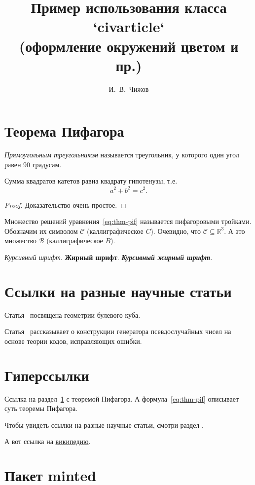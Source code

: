 \documentclass[12pt, minted]{civarticle}
\title{
    Пример использования класса `civarticle`\\
    \small{(оформление окружений цветом и пр.)}
}
\author{И.~В.~Чижов}
\begin{document}
    \section{Теорема Пифагора}
    \label{sec:thm-pif}
    \begin{definition}
        \label{def:triangle}
        \emph{Прямоугольным треугольником} называется треугольник, у которого один угол равен 90 градусам.
    \end{definition}
    \begin{theorem}
        Сумма квадратов катетов равна квадрату гипотенузы, т.е.
        \begin{equation}
            \label{eq:thm-pif}
            a^2+b^2=c^2.
        \end{equation}
    \end{theorem}
    \begin{proof}
        Доказательство очень простое.
    \end{proof}
    Множество решений уравнения~\eqref{eq:thm-pif} называется пифагоровыми тройками.
    Обозначим их символом $\mathcal{C}$ (каллиграфическое $C$).
    Очевидно, что $\mathcal{C}\subseteq \mathbb{R}^{3}$.
    А это множество $\mathcal{B}$ (каллиграфическое $B$).

    \textit{Курсивный шрифт}.
    \textbf{Жирный шрифт}.
    \textit{\textbf{Курсивный жирный шрифт}}.

    \blindmathtrue
    \Blindtext[11][1]


    \section{Ссылки на разные научные статьи}
    \label{sec:ref-to-articles}

    Статья~\cite{ahlswede1977} посвящена геометрии булевого куба.

    Статья~\cite{ahmed2013} рассказывает о конструкции генератора псевдослучайных чисел на основе теории кодов, исправляющих ошибки.


    \section{Гиперссылки}
    \label{sec:hyper}

    Ссылка на раздел~\ref{sec:thm-pif} с теоремой Пифагора.
    А формула~\eqref{eq:thm-pif} описывает суть теоремы Пифагора.

    Чтобы увидеть ссылки на разные научные статьи, смотри раздел \hyperref[sec:ref-to-articles]{}.

    А вот ссылка на \href{https://ru.wikipedia.org}{википедию}.


    \section{Пакет minted}
    \label{sec:minted}
    \if \MINTED\empty
    \else
        \inputminted{python}{code.py}
    \fi
\end{document}
